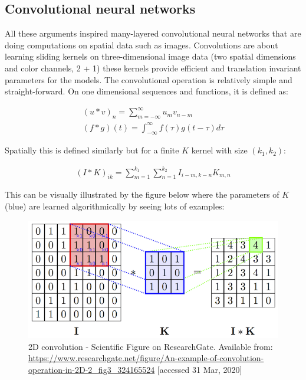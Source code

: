 \documentclass[a4paper,12pt]{article}
\begin{document}
\vspace{7mm}

\subsection{Convolutional neural networks}

\vspace{7mm}

\par All these arguments inspired many-layered convolutional neural networks that are doing computations on spatial data such as images. Convolutions are about learning sliding kernels on three-dimensional image data (two spatial dimensions and color channels, 2 + 1) these kernels provide efficient and translation invariant parameters for the models. The convolutional operation is relatively simple and straight-forward. On one dimensional sequences and functions, it is defined as:

\begin{align*}
    (u * v)_n = \sum_{m = -\infty}^{\infty} u_{m} v_{n-m} \\
    (f * g)(t) = \int_{-\infty}^{\infty} f(\tau)g(t-\tau)d\tau
\end{align*}

\vspace{4mm}

\par Spatially this is defined similarly but for a finite $K$ kernel with size $(k_1, k_2)$:

\vspace{4mm}

\begin{align*}
    (I * K)_{ik} = \sum_{m = 1}^{k_1}\sum_{n = 1}^{k_2} I_{i - m, k - n} K_{m, n}
\end{align*}

\vspace{4mm}

\par This can be visually illustrated by the figure below where the parameters of $K$ (blue) are learned algorithmically by seeing lots of examples:

\vspace{4mm}

\begin{figure}[H]
    \centering
    \includegraphics[width=0.7\linewidth]{An-example-of-convolution-operation-in-2D-2.png}
    \caption{2D convolution - Scientific Figure on ResearchGate. Available from: \url{https://www.researchgate.net/figure/An-example-of-convolution-operation-in-2D-2_fig3_324165524} [accessed 31 Mar, 2020]}
    \label{fig:2d-conv}
\end{figure}
\end{document}
